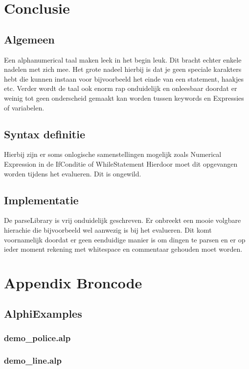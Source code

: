 \documentclass[a4paper,10pt]{article}
\newcommand{\putmyhaskellhere}[2]{
  \subsubsection{#1.#2}
  
}
\begin{document}
\section{Conclusie}

  \subsection{Algemeen}
 Een alphanumerical taal maken leek in het begin leuk. Dit bracht echter enkele nadelen met zich mee.
Het grote nadeel hierbij is dat je geen speciale karakters hebt die kunnen instaan voor bijvoorbeeld het einde van een statement, haakjes etc.
Verder wordt de taal ook enorm rap onduidelijk en onleesbaar doordat er weinig tot geen onderscheid gemaakt kan worden tussen keywords en Expressies of variabelen.

  \subsection{Syntax definitie}
Hierbij zijn er soms onlogische samenstellingen mogelijk zoals Numerical Expression in de IfConditie of WhileStatement
Hierdoor moet dit opgevangen worden tijdens het evalueren. Dit is ongewild.

  \subsection{Implementatie}
De parseLibrary is vrij onduidelijk geschreven. Er onbreekt een mooie volgbare hierachie die bijvoorbeeld wel aanwezig is bij het evalueren.
Dit komt voornamelijk doordat er geen eenduidige manier is om dingen te parsen en er op ieder moment rekening met whitespace en commentaar gehouden moet worden.

\section{Appendix Broncode}
  \subsection{AlphiExamples}
    \subsubsection{demo\_police.alp}
      
    \subsubsection{demo\_line.alp}
      
\end{document}
